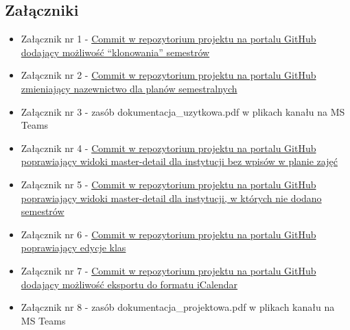 \documentclass[12pt,a4paper,oneside]{article}
\theoremstyle{definition}
\numberwithin{equation}{section}
\begin{document}
\subsection{Załączniki}
\begin{itemize}
\item Załącznik nr 1 - \href{https://github.com/lukaszgo1/engineering_project_2022/commit/993eb9d0484f1f72a967801111a22c9459a61131}{Commit w repozytorium projektu na portalu GitHub dodający możliwość ``klonowania'' semestrów}
\item Załącznik nr 2 - \href{https://github.com/lukaszgo1/engineering_project_2022/commit/24a65968bd2a3b9a1641a25c3fa7a3e7c64bd534}{Commit w repozytorium projektu na portalu GitHub zmieniający nazewnictwo dla planów semestralnych}
\item Załącznik nr 3 - zasób dokumentacja\_uzytkowa.pdf w plikach kanału na MS Teams
\item Załącznik nr 4 - \href{https://github.com/lukaszgo1/engineering_project_2022/commit/7696b0522caf71eae4eb419252ad20ea279af8b2}{Commit w repozytorium projektu na portalu GitHub poprawiający widoki master-detail dla instytucji bez wpisów w planie zajęć}
\item Załącznik nr 5 - \href{https://github.com/lukaszgo1/engineering_project_2022/commit/6b3934552c834893e923e5cce43d2acc66aa1c30}{Commit w repozytorium projektu na portalu GitHub poprawiający widoki master-detail dla instytucji, w których nie dodano semestrów}
\item Załącznik nr 6 - \href{https://github.com/lukaszgo1/engineering_project_2022/commit/da91c1cd82fda749c5185df2214787cb1ae79927}{Commit w repozytorium projektu na portalu GitHub poprawiający edycje klas}
\item Załącznik nr 7 - \href{https://github.com/lukaszgo1/engineering_project_2022/commit/a429a7473895893b47cc9253f6caa329bea142da}{Commit w repozytorium projektu na portalu GitHub dodający możliwość eksportu do formatu iCalendar}
\item Załącznik nr 8 - zasób dokumentacja\_projektowa.pdf w plikach kanału na MS Teams
\end{itemize}
\end{document}
